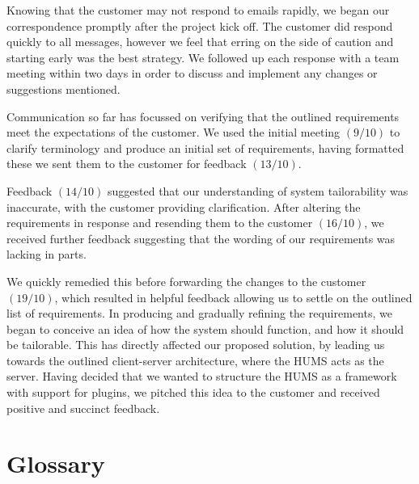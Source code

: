 \documentclass[10pt,a4paper]{article}
\begin{document}
Knowing that the customer may not respond to emails rapidly, we began our
correspondence promptly after the project kick off. The customer did
respond quickly to all messages, however we feel that erring on the side of
caution and starting early was the best strategy. We followed up each response
with a team meeting within two days in order to discuss and implement any
changes or suggestions mentioned.

Communication so far has focussed on verifying that the outlined requirements
meet the expectations of the customer. We used the initial meeting $(9/10)$ to
clarify terminology and produce an initial set of requirements,  having
formatted these we sent them to the customer for feedback $(13/10)$.

Feedback $(14/10)$ suggested that our understanding of system tailorability was
inaccurate, with the customer providing clarification. After altering the
requirements in response and resending them to the customer $(16/10)$, we received
further feedback suggesting that the wording of our requirements was lacking in
parts.

We quickly remedied this before forwarding the changes to the customer $(19/10)$,
which resulted in helpful feedback allowing us to settle on the outlined list
of requirements. In producing and gradually refining the requirements, we began
to conceive an idea of how the system should function, and how it should be
tailorable. This has directly affected our proposed solution, by leading us
towards the outlined client-server architecture, where the HUMS acts as the
server. Having decided that we wanted to structure the HUMS as a framework with
support for plugins, we pitched this idea to the customer and received positive
and succinct feedback.

\section{Glossary}
\end{document}
